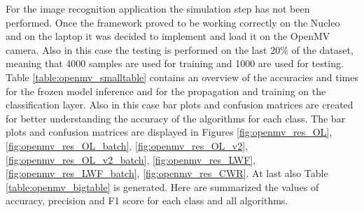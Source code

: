 \documentclass[12pt]{report}
\begin{document}
For the image recognition application the simulation step has not been performed. Once the framework proved to be working correctly on the Nucleo and on the laptop it was decided to implement and load it on the OpenMV camera. Also in this case the testing is performed on the last $20 \%$ of the dataset, meaning that 4000 samples are used for training and 1000 are used for testing. Table \ref{table:openmv_smalltable} contains an overview of the accuracies and times for the frozen model inference and for the propagation and training on the classification layer. Also in this case bar plots and confusion matrices are created for better understanding the accuracy of the algorithms for each class. The bar plots and confusion matrices are displayed in Figures \ref{fig:openmv_res_OL}, \ref{fig:openmv_res_OL_batch}, \ref{fig:openmv_res_OL_v2}, \ref{fig:openmv_res_OL_v2_batch}, \ref{fig:openmv_res_LWF}, \ref{fig:openmv_res_LWF_batch}, \ref{fig:openmv_res_CWR}. At last also Table \ref{table:openmv_bigtable} is generated. Here are summarized the values of accuracy, precision and F1 score for each class and all algorithms. 
\end{document}
